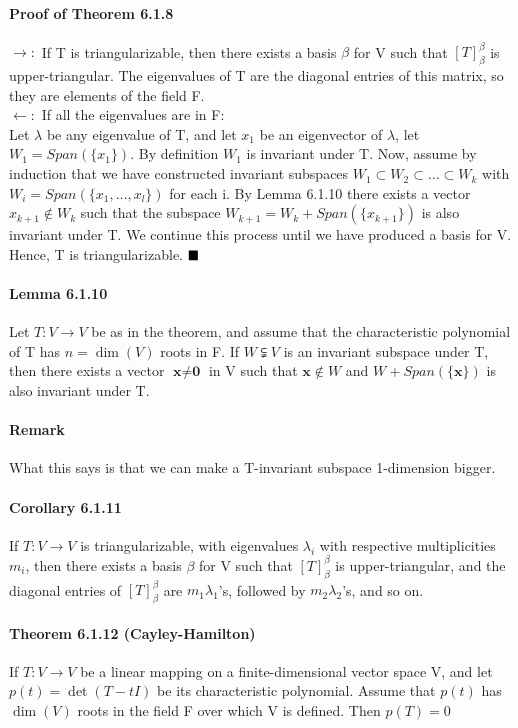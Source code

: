 \documentclass[11pt]{article}
\newcommand{\tb}[1]{\textbf{#1}}
\newcommand{\qed}[0]{$\hfill\blacksquare$}
\newcommand{\vx}[0]{\tb{x}}
\newcommand{\vo}[0]{\tb{0}}
\begin{document}
{\paragraph{Proof of Theorem 6.1.8}
$\rightarrow:$ If T is triangularizable, then there exists a basis $\beta$ for V such that $[T]_\beta^\beta$ is upper-triangular. The eigenvalues of T are the diagonal entries of this matrix, so they are elements of the field F.\\
$\leftarrow:$ If all the eigenvalues are in F:\\
Let $\lambda$ be any eigenvalue of T, and let $x_1$ be an eigenvector of $\lambda$, let $W_1 = Span(\{x_1\})$. By definition $W_1$ is invariant under T. Now, assume by induction that we have constructed invariant subspaces $W_1 \subset W_2 \subset \hdots \subset W_k$ with $W_i = Span(\{x_1,\hdots,x_l\})$ for each i. By Lemma 6.1.10 there exists a vector $x_{k+1} \notin W_k$ such that the subspace $W_{k+1} = W_k + Span(\{x_{k+1}\})$ is also invariant under T. We continue this process until we have produced a basis for V. Hence, T is triangularizable. \qed

\paragraph{Lemma 6.1.10} Let $T: V \rightarrow V$ be as in the theorem, and assume that the characteristic polynomial of T has $n = \dim(V)$ roots in F. If $W \subsetneqq V$ is an invariant subspace under T, then there exists a vector $\vx \neq\vo$ in V such that $\vx \notin W$ and $W + Span(\{\vx\})$ is also invariant under T.
\paragraph{Remark}
What this says is that we can make a T-invariant subspace 1-dimension bigger.
\paragraph{Corollary 6.1.11} If $T: V \rightarrow V$ is triangularizable, with eigenvalues $\lambda_i$ with respective multiplicities $m_i$, then there exists a basis $\beta$ for V such that $[T]_\beta^\beta$ is upper-triangular, and the diagonal entries of $[T]_\beta^\beta$ are $m_1\lambda_1$'s, followed by $m_2 \lambda_2$'s, and so on.
\paragraph{Theorem 6.1.12 (Cayley-Hamilton)} If $T: V \rightarrow V$ be a linear mapping on a finite-dimensional vector space V, and let $p(t) = \det(T - tI)$ be its characteristic polynomial. Assume that $p(t)$ has $\dim(V)$ roots in the field F over which V is defined. Then $p(T) = 0$ 
}
\end{document}
